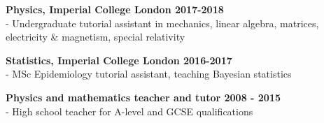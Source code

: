 \noindent \textbf{Physics, Imperial College London \hfill 2017-2018}\\
\noindent - Undergraduate tutorial assistant in mechanics, linear algebra, matrices, electricity \& magnetism, special relativity
\bigskip

\noindent \textbf{Statistics, Imperial College London \hfill 2016-2017}\\
- MSc Epidemiology tutorial assistant, teaching Bayesian statistics
\bigskip

\noindent \textbf{Physics and mathematics teacher and tutor \hfill 2008 - 2015}\\
- High school teacher for A-level and GCSE qualifications\\

